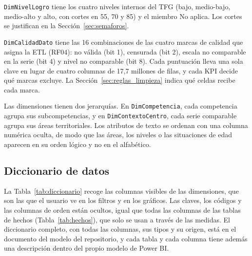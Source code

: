 \documentclass[12pt, a4paper, oneside]{report}
\begin{document}
\texttt{DimNivelLogro} tiene los cuatro niveles internos del TFG (bajo, medio-bajo, medio-alto y alto, con cortes en 55, 70 y 85) y el miembro \guillemotleft{}No aplica\guillemotright{}. Los cortes se justifican en la Sección~\ref{sec:semaforos}.

\texttt{DimCalidadDato} tiene las 16 combinaciones de las cuatro marcas de calidad que asigna la ETL (RF04): no válida (bit 1), censurada (bit 2), escala no comparable en la serie (bit 4) y nivel no comparable (bit 8). Cada puntuación lleva una sola clave en lugar de cuatro columnas de 17,7 millones de filas, y cada KPI decide qué marcas excluye. La Sección~\ref{sec:reglas_limpieza} indica qué celdas recibe cada marca.

Las dimensiones tienen dos jerarquías. En \texttt{DimCompetencia}, cada competencia agrupa sus subcompetencias, y en \texttt{DimContextoCentro}, cada serie comparable agrupa sus áreas territoriales. Los atributos de texto se ordenan con una columna numérica oculta, de modo que las áreas, los niveles o las situaciones de edad aparecen en su orden lógico y no en el alfabético.

\subsection{Diccionario de datos}
\label{sec:diccionario_datos}
La Tabla~\ref{tab:diccionario} recoge las columnas visibles de las dimensiones, que son las que el usuario ve en los filtros y en los gráficos. Las claves, los códigos y las columnas de orden están ocultos, igual que todas las columnas de las tablas de hechos (Tabla~\ref{tab:hechos}), que solo se usan a través de las medidas. El diccionario completo, con todas las columnas, sus tipos y su origen, está en el documento del modelo del repositorio, y cada tabla y cada columna tiene además una descripción dentro del propio modelo de Power BI.
\end{document}
